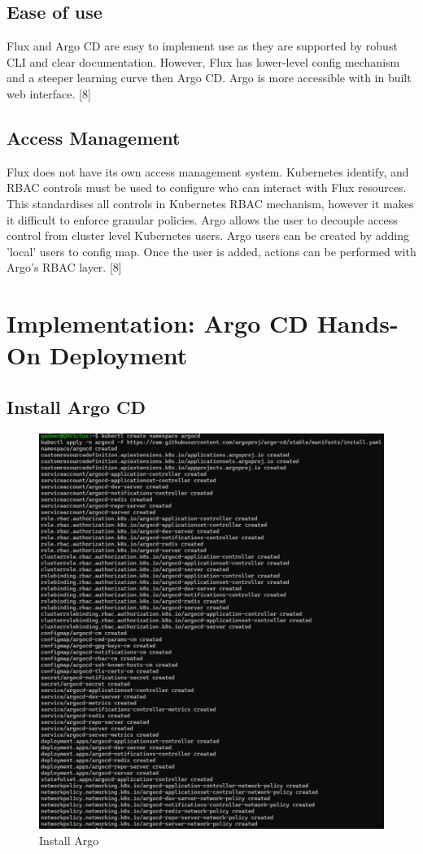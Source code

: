 \documentclass[conference]{IEEEtran}
\begin{document}
\subsection{Ease of use}
Flux and Argo CD are easy to implement use as they are supported by robust CLI and clear documentation. However, Flux has lower-level config mechanism and a steeper learning curve then Argo CD. Argo is more accessible with in built web interface. [8]

\subsection{Access Management}
Flux does not have its own access management system. Kubernetes identify, and RBAC controls must be used to configure who can interact with Flux resources. This standardises all controls in Kubernetes RBAC mechanism, however it makes it difficult to enforce granular policies. Argo allows the user to decouple access control from cluster level Kubernetes users. Argo users can be created by adding 'local' users to config map. Once the user is added, actions can be performed with Argo's RBAC layer. [8]

\section{Implementation: Argo CD Hands-On Deployment}
\subsection{Install Argo CD}
\begin{figure}[htbp]
    \centering
    \includegraphics[width=0.8\linewidth]{Install Argo CD.png}
    \caption{Install Argo}
    \label{fig:install-argo-cd}
\end{figure}
\end{document}
